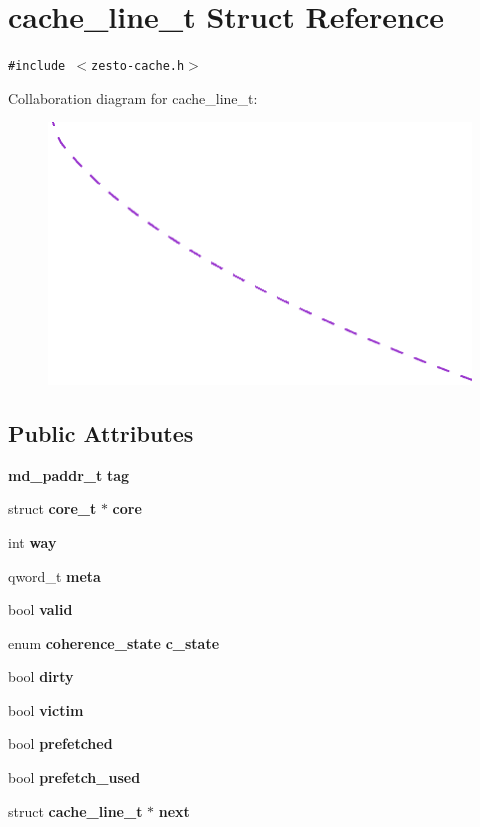 \section{cache\_\-line\_\-t Struct Reference}
\label{structcache__line__t}
{\tt \#include $<$zesto-cache.h$>$}

Collaboration diagram for cache\_\-line\_\-t:\nopagebreak
\begin{figure}[H]
\begin{center}
\leavevmode
\includegraphics[width=400pt]{structcache__line__t__coll__graph}
\end{center}
\end{figure}
\subsection*{Public Attributes}
\begin{CompactItemize}
\item 
{\bf md\_\-paddr\_\-t} {\bf tag}
\item 
struct {\bf core\_\-t} $\ast$ {\bf core}
\item 
int {\bf way}
\item 
qword\_\-t {\bf meta}
\item 
bool {\bf valid}
\item 
enum {\bf coherence\_\-state} {\bf c\_\-state}
\item 
bool {\bf dirty}
\item 
bool {\bf victim}
\item 
bool {\bf prefetched}
\item 
bool {\bf prefetch\_\-used}
\item 
struct {\bf cache\_\-line\_\-t} $\ast$ {\bf next}
\end{CompactItemize}


